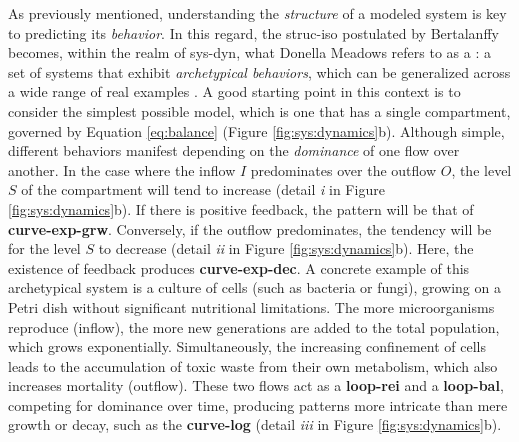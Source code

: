 \documentclass[./main_en.tex]{subfiles}
\begin{document}
\par As previously mentioned, understanding the \textit{structure} of a modeled \gls{system} is key to predicting its \textit{behavior}. In this regard, the \gls{struc-iso} postulated by Bertalanffy becomes, within the realm of \gls{sys-dyn}, what Donella Meadows refers to as a : a set of systems that exhibit \textit{archetypical behaviors}, which can be generalized across a wide range of real examples \cite{meadows2008}. A good starting point in this context is to consider the simplest possible \gls{model}, which is one that has a single compartment, governed by Equation \eqref{eq:balance} (Figure \ref{fig:sys:dynamics}b). Although simple, different behaviors manifest depending on the \textit{dominance} of one flow over another. In the case where the inflow $I$ predominates over the outflow $O$, the level $S$ of the compartment will tend to increase (detail \textrm{\textit{i}} in Figure \ref{fig:sys:dynamics}b). If there is positive \gls{feedback}, the pattern will be that of \textbf{\gls{curve-exp-grw}}. Conversely, if the outflow predominates, the tendency will be for the level $S$ to decrease (detail \textrm{\textit{ii}} in Figure \ref{fig:sys:dynamics}b). Here, the existence of \gls{feedback} produces \textbf{\gls{curve-exp-dec}}. A concrete example of this archetypical \gls{system} is a culture of cells (such as bacteria or fungi), growing on a Petri dish without significant nutritional limitations. The more microorganisms reproduce (inflow), the more new generations are added to the total population, which grows exponentially. Simultaneously, the increasing confinement of cells leads to the accumulation of toxic waste from their own metabolism, which also increases mortality (outflow). These two flows act as a \textbf{\gls{loop-rei}} and a \textbf{\gls{loop-bal}}, competing for dominance over time, producing patterns more intricate than mere growth or decay, such as the \textbf{\gls{curve-log}} (detail \textrm{\textit{iii}} in Figure \ref{fig:sys:dynamics}b).
\end{document}

